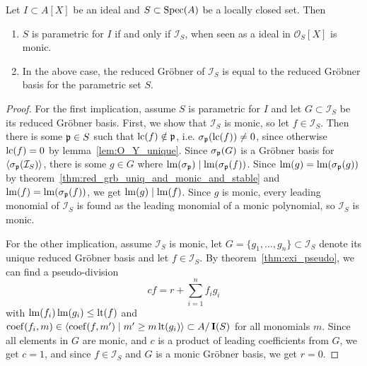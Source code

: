 \begin{theorem}\label{thm:para_iff_I_S_monic}
  Let $I \subset A[X]$ be an ideal and $S \subset \operatorname{Spec}(A)$ be a locally closed set. Then
  \begin{enumerate}
    \item $S$ is parametric for $I$ if and only if $\mathcal I_{S}$, when seen as a ideal in $\mathcal O_{S}[X]$ is monic.
    \item In the above case, the reduced Gröbner of $\mathcal I_{S}$ is equal to the reduced Gröbner basis for the parametric set $S$.
  \end{enumerate}
\end{theorem}
\begin{proof}
  For the first implication, assume $S$ is parametric for $I$ and let $G \subset \mathcal I_{S}$ be its reduced Gröbner basis. First, we show that $\mathcal I_{S}$ is monic, so let $f \in \mathcal I_{S}$. Then there is some $\mathfrak p \in S$ such that $\operatorname{lc}(f) \notin \mathfrak p$, i.e. $\sigma_{\mathfrak p}(\operatorname{lc}(f)) \neq 0$, since otherwise $\operatorname{lc}(f) = 0$ by lemma~\ref{lem:O_Y_unique}. Since $\sigma_{\mathfrak p}(G)$ is a Gröbner basis for $\langle \sigma_{\mathfrak p}(\mathcal I_{S}) \rangle$, there is some $g \in G$ where $\operatorname{lm}(\sigma_{\mathfrak p}) \mid \operatorname{lm}(\sigma_{\mathfrak p}(f))$. Since $\operatorname{lm}(g) = \operatorname{lm}(\sigma_{\mathfrak p}(g))$ by theorem~\ref{thm:red_grb_uniq_and_monic_and_stable} and $\operatorname{lm}(f) = \operatorname{lm}(\sigma_{\mathfrak p}(f))$, we get $\operatorname{lm}(g) \mid \operatorname{lm}(f)$. Since $g$ is monic, every leading monomial of $\mathcal I_{S}$ is found as the leading monomial of a monic polynomial, so $\mathcal I_{S}$ is monic.

  For the other implication, assume $\mathcal I_{S}$ is monic, let $G = \{g_{1}, \dots, g_{n}\} \subset \mathcal I_{S}$ denote its unique reduced Gröbner basis and let $f \in \mathcal I_{S}$. By theorem~\ref{thm:exi_pseudo}, we can find a pseudo-division
  \[cf = r +  \sum_{i=1}^{n} f_{i} g_{i}\]
  with $\operatorname{lm}(f_{i})\operatorname{lm}(g_{i}) \leq \operatorname{lt}(f)$ and $\operatorname{coef}(f_{i}, m) \in \langle \operatorname{coef}(f, m') \mid m' \geq m \operatorname{lt}(g_{i}) \rangle \subset A/\operatorname{\mathbf I}(S)$ for all monomials $m$. Since all elements in $G$ are monic, and $c$ is a product of leading coefficients from $G$, we get $c = 1$, and since $f \in \mathcal I_{S}$ and $G$ is a monic Gröbner basis, we get $r = 0$.


\end{proof}
